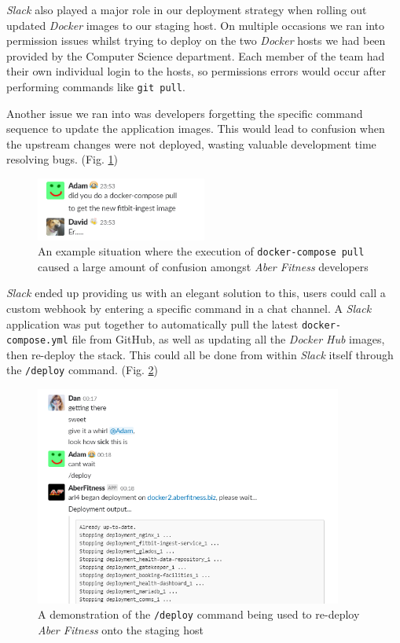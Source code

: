 \textit{Slack} also played a major role in our deployment strategy when rolling out updated \textit{Docker} images to our staging host. On multiple occasions we ran into permission issues whilst trying to deploy on the two \textit{Docker} hosts we had been provided by the Computer Science department. Each member of the team had their own individual login to the hosts, so permissions errors would occur after performing commands like \lstinline{git pull}. 

Another issue we ran into was developers forgetting the specific command sequence to update the application images. This would lead to confusion when the upstream changes were not deployed, wasting valuable development time resolving bugs. (Fig. \ref{fig:david_being_a_dumbass})

\begin{figure}[H]
    \centering
    \includegraphics[width=0.5\textwidth]{Images/aberfitness_slack_bot_reason_why.png}
    \caption{An example situation where the execution of \lstinline{docker-compose pull} caused a large amount of confusion amongst \textit{Aber Fitness} developers}
    \label{fig:david_being_a_dumbass}
\end{figure}

\textit{Slack} ended up providing us with an elegant solution to this, users could call a custom webhook by entering a specific command in a chat channel. A \textit{Slack} application was put together to automatically pull the latest \lstinline{docker-compose.yml} file from GitHub, as well as updating all the \textit{Docker Hub} images, then re-deploy the stack. This could all be done from within \textit{Slack} itself through the \lstinline{/deploy} command. (Fig. \ref{fig:slack_bot})

\begin{figure}[H]
    \centering
    \includegraphics[width=0.9\textwidth]{Images/aberfitness_slack_bot.png}
    \caption{A demonstration of the \lstinline{/deploy} command being used to re-deploy \textit{Aber Fitness} onto the staging host}
    \label{fig:slack_bot}
\end{figure}

